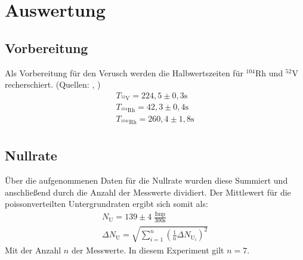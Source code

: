 \section{Auswertung}
\subsection{Vorbereitung}
Als Vorbereitung für den Verusch werden die Halbwertszeiten für $^{104}$Rh und $^{52}$V recherschiert. (Quellen: \cite{V} , \cite{Rh})
\begin{align}
    T_{^{52}\text{V}} = 224,5 \pm 0,3 \text{s}\\
    T_{^{104}\text{Rh}} = 42,3 \pm 0,4 \text{s}\\
    T_{^{104i}\text{Rh}} = 260,4 \pm 1,8 \text{s}\\
\end{align}
\subsection{Nullrate}
Über die aufgenommenen Daten für die Nullrate wurden diese Summiert und anschließend durch die Anzahl der Messwerte dividiert.
Der Mittlewert für die poissonverteilten Untergrundraten ergibt sich somit als:
\begin{align}
    N_{\text{U}} =  139\pm 4 \; \frac{\text{Imp}}{300 \text{s}} \\
    \Delta N_{\text{U}} = \sqrt{ \sum_{i=1}^n \left( \frac{1}{n}\Delta N_{\text{U}_{\text{i}}} \right)^2}
\end{align}
Mit der Anzahl $n$ der Messwerte. In diesem Experiment gilt $n = 7$.

